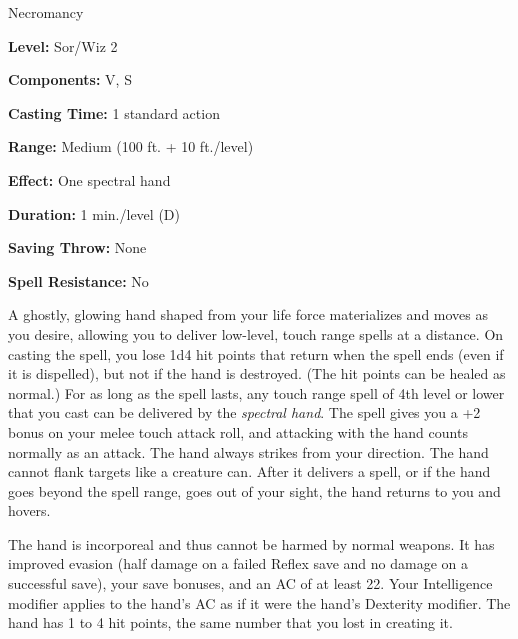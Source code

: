 
Necromancy

\textbf{Level:} Sor/Wiz 2

\textbf{Components:} V, S

\textbf{Casting Time:} 1 standard action

\textbf{Range:} Medium (100 ft. + 10 ft./level)

\textbf{Effect:} One spectral hand

\textbf{Duration:} 1 min./level (D)

\textbf{Saving Throw:} None

\textbf{Spell Resistance:} No

A ghostly, glowing hand shaped from your life force materializes and moves as you 
desire, allowing you to deliver low-level, touch range spells at a distance. On 
casting the spell, you lose 1d4 hit points that return when the spell ends (even 
if it is dispelled), but not if the hand is destroyed. (The hit points can be healed 
as normal.) For as long as the spell lasts, any touch range spell of 4th level 
or lower that you cast can be delivered by the \textit{spectral hand}. The spell 
gives you a +2 bonus on your melee touch attack roll, and attacking with the hand 
counts normally as an attack. The hand always strikes from your direction. The 
hand cannot flank targets like a creature can. After it delivers a spell, or if 
the hand goes beyond the spell range, goes out of your sight, the hand returns 
to you and hovers.

The hand is incorporeal and thus cannot be harmed by normal weapons. It has improved 
evasion (half damage on a failed Reflex save and no damage on a successful save), 
your save bonuses, and an AC of at least 22. Your Intelligence modifier applies 
to the hand's AC as if it were the hand's Dexterity modifier. The hand has 1 to 
4 hit points, the same number that you lost in creating it.

